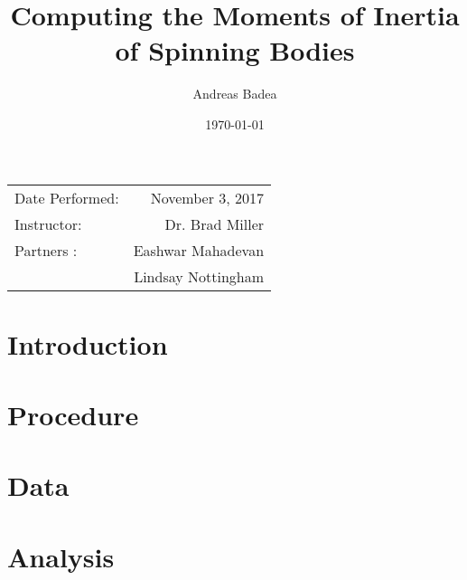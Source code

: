 \documentclass[11pt]{article}
\title{Computing the Moments of Inertia of Spinning Bodies}
\author{Andreas Badea}
\date{\today}
\begin{document}
\maketitle

\begin{center}
	\begin{tabular}{l r}
		Date Performed: & November 3, 2017 \\ %
		Instructor: & Dr. Brad Miller \\ %
		Partners : & Eashwar Mahadevan \\
		& Lindsay Nottingham
	\end{tabular}
\end{center}

\section{Introduction}
\section{Procedure}
\section{Data}
\section{Analysis}
\end{document}
